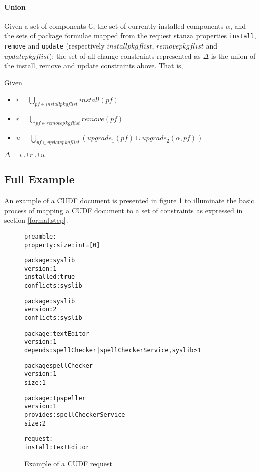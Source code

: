 \paragraph{Union}
Given a set of components $\mathbb{C}$, the set of currently installed components $\alpha$,
and the sets of package formulae mapped from the request stanza properties \verb+install+, \verb+remove+ and \verb+update+ 
(respectively $installpkgflist$, $removepkgflist$ and $updatepkgflist$);
the set of all change constraints represented as $\Delta$ is the union of the install, remove and update constraints above.
That is, 
\begin{defs}
Given 
\begin{itemize}
  \item $i = \bigcup \limits_{pf \in installpkgflist} install(pf)$
  \item $r = \bigcup \limits_{pf \in removepkgflist} remove(pf)$
  \item $u = \bigcup \limits_{pf \in updatepkgflist} (upgrade_1(pf) \cup upgrade_2(\alpha,pf))$
\end{itemize}
$\Delta =  i \cup r \cup u$
\end{defs}

\subsection{Full Example}
\label{formal.example}
An example of a CUDF document is presented in figure \ref{formal.CUDFEXAMPLE} to illuminate the basic process of mapping a CUDF document to a set of constraints as expressed in section \ref{formal.step}.

\begin{figure}[htp] 
\begin{center}
\begin{alltt}
preamble:
property: size: int = [0]

package: syslib
version: 1
installed: true
conflicts: syslib

package: syslib
version: 2
conflicts: syslib

package: textEditor
version: 1
depends: spellChecker | spellCheckerService, syslib > 1

package spellChecker
version: 1
size: 1

package: tpspeller
version: 1
provides: spellCheckerService
size: 2

request:
install:textEditor

\end{alltt}
  \caption[CUDF Example]{Example of a CUDF request}
  \label{formal.CUDFEXAMPLE}
\end{center}
\end{figure} 


